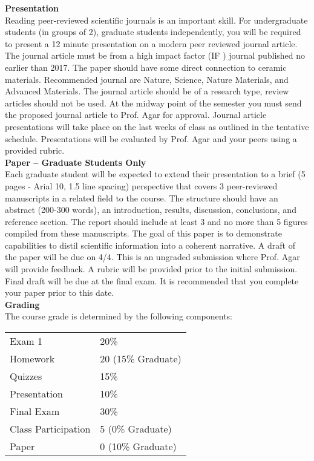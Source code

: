 \documentclass[11pt,letterpaper]{article}
\newcommand{\lefthead}[2]{\noindent\textbf{#1}\hfill\\[#2]}
\begin{document}
\lefthead{Presentation}{0.3cm}
Reading peer-reviewed scientific journals is an important skill. 
For undergraduate students (in groups of 2), graduate students independently, you will be required to present a 12 minute presentation on a modern peer reviewed journal article. 
The journal article must be from a high impact factor (IF ) journal published no earlier than 2017. 
The paper should have some direct connection to ceramic materials. 
Recommended journal are Nature, Science, Nature Materials, and Advanced Materials. 
The journal article should be of a research type, review articles should not be used.
At the midway point of the semester you must send the proposed journal article to Prof. Agar for approval.
Journal article presentations will take place on the last weeks of class as outlined in the tentative schedule.
Presentations will be evaluated by Prof. Agar and your peers using a provided rubric. \\[.3cm]

\lefthead{Paper -- Graduate Students Only}{0.3cm}
Each graduate student will be expected to extend their presentation to a brief (5 pages - Arial 10, 1.5 line spacing) perspective that covers 3 peer-reviewed manuscripts in a related field to the course. 
The structure should have an abstract (200-300 words), an introduction, results, discussion, conclusions, and reference section.
The report should include at least 3 and no more than 5 figures compiled from these manuscripts. 
The goal of this paper is to demonstrate capabilities to distil scientific information into a coherent narrative. 
A draft of the paper will be due on 4/4. This is an ungraded submission where Prof. Agar will provide feedback.
A rubric will be provided prior to the initial submission. 
Final draft will be due at the final exam. It is recommended that you complete your paper prior to this date.\\[.3cm]

\lefthead{Grading}{0.3cm}
\noindent The course grade is determined by the following components:
	\begin{table}[H]
	\centering
	\begin{tabular}{ll}
        Exam 1 & 20\% \\
        Homework & 20 (15\% Graduate) \\
        Quizzes & 15\% \\
        Presentation & 10\% \\
        Final Exam & 30\% \\
        Class Participation & 5 (0\% Graduate)\\
        Paper & 0 (10\% Graduate)\\
        \end{tabular}
        \end{table} 
        \\
        \vspace{0.3cm}
\end{document}
